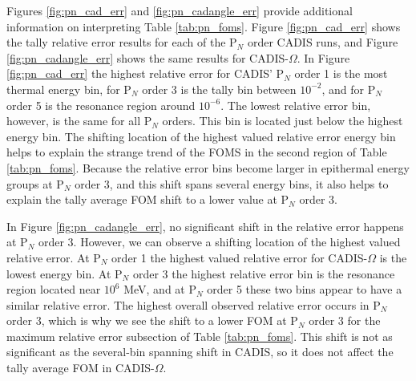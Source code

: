 Figures \ref{fig:pn_cad_err} and \ref{fig:pn_cadangle_err} provide additional
information on interpreting Table \ref{tab:pn_foms}. Figure \ref{fig:pn_cad_err}
shows the tally relative error results for each of the P$_N$ order CADIS runs,
and Figure
\ref{fig:pn_cadangle_err} shows the same results for CADIS-$\Omega$. In Figure
\ref{fig:pn_cad_err} the highest relative error for CADIS'
P$_N$ order 1 is the most thermal energy bin, for P$_N$ order 3 is the tally bin
between $10^{-2}$, and for P$_N$ order 5 is the resonance region around
$10^{-6}$. The lowest relative error bin, however, is the same for all P$_N$
orders. This bin is located just below the highest energy bin. The shifting
location of the highest valued relative error energy bin helps to explain the
strange trend of the FOMS in the second region of Table \ref{tab:pn_foms}.
Because the relative error bins  become larger in epithermal
energy groups at P$_N$ order 3, and this shift spans several energy bins, it
also helps to explain the tally average FOM shift to a lower value at P$_N$
order 3.

In Figure \ref{fig:pn_cadangle_err}, no significant shift in the relative error
happens at P$_N$ order 3. However, we can observe a shifting location of the highest
valued relative error. At P$_N$ order 1 the highest valued relative error for
CADIS-$\Omega$ is the lowest energy bin. At P$_N$ order 3 the highest relative
error bin is the resonance region located near $10^{6}$ MeV,  and at P$_N$ order
5 these two bins appear to have a similar relative error. The highest overall
observed relative error occurs in P$_N$ order 3, which is why we see the shift
to a lower FOM at P$_N$ order 3 for the maximum relative error subsection of
Table \ref{tab:pn_foms}. This shift is not as significant as the several-bin
spanning shift in CADIS, so it does not affect the tally average FOM in
CADIS-$\Omega$.

